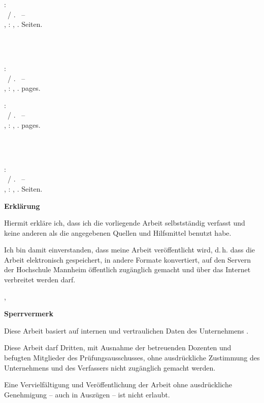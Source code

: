 \null\newpage
\thispagestyle{empty}
  
\newcommand{\hsmabibde}{\begin{small}\textbf{\hsmaautorbib}: \\ \hsmatitelde \ / \hsmaautor. \ -- \\ \hsmatypde, \hsmaort : \hsmakoerperschaftde, \hsmajahr. \pageref{lastpage} Seiten.\end{small}}

\newcommand{\hsmabiben}{\begin{small}\textbf{\hsmaautorbib}: \\ \hsmatitelen \ / \hsmaautor. \ -- \\ \hsmatypen, \hsmaort : \hsmakoerperschaften, \hsmajahr. \pageref{lastpage} pages. \end{small}}

%
  {\hsmabibde \\ \vspace{0.5cm} \\ \hsmabiben}
  {\hsmabiben \\ \vspace{0.5cm} \\ \hsmabibde}


\clearpage\setcounter{page}{1}
\thispagestyle{empty}
\textsf{\large\textbf{Erklärung}}

Hiermit erkläre ich, dass ich die vorliegende Arbeit selbstständig verfasst und keine anderen als die angegebenen Quellen und Hilfsmittel benutzt habe.

%
{
\vspace{0.5cm}
Ich bin damit einverstanden, dass meine Arbeit veröffentlicht wird, d.\,h. dass die Arbeit elektronisch gespeichert, in andere Formate konvertiert, auf den Servern der Hochschule Mannheim öffentlich zugänglich gemacht und über das Internet verbreitet werden darf. 
}{}%


\vspace{1cm}
\hsmaort, \hsmadatum \\

\vspace{1.2cm}						                                      
\hsmaautor

%
{%
\vspace{11cm}
\color{red}\textsf{\large\textbf{Sperrvermerk}}

Diese Arbeit basiert auf internen und vertraulichen Daten des Unternehmens \hsmafirma.

Diese Arbeit darf Dritten, mit Ausnahme der betreuenden Dozenten und befugten Mitglieder des Prüfungsausschusses, ohne ausdrückliche Zustimmung des Unternehmens und des Verfassers nicht zugänglich gemacht werden.

Eine Vervielfältigung und Veröffentlichung der Arbeit ohne ausdrückliche Genehmigung -- auch in Auszügen -- ist nicht erlaubt.
\color{black}
}{}


